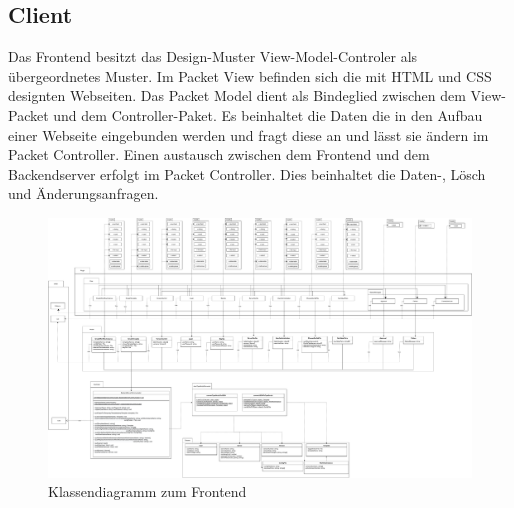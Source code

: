 \subsection{Client}
Das Frontend besitzt das Design-Muster View-Model-Controler als übergeordnetes Muster. Im Packet \glqq View\grqq{} befinden sich die mit HTML und CSS designten Webseiten. Das Packet \glqq Model\grqq{} dient als Bindeglied zwischen dem \glqq View\grqq{}-Packet und dem \glqq Controller\grqq{}-Paket. Es beinhaltet die Daten die in den Aufbau einer Webseite eingebunden werden und fragt diese an und lässt sie ändern im Packet \glqq Controller\grqq{}. Einen austausch zwischen dem Frontend und dem Backendserver erfolgt im Packet \glqq Controller\grqq{}. Dies beinhaltet die Daten-, Lösch und Änderungsanfragen.

\begin{figure}[H]
\centerline{\includegraphics[scale=0.2]{res/FrontendUML.drawio.pdf}}
\caption{Klassendiagramm zum Frontend}
\end{figure}

\newpage